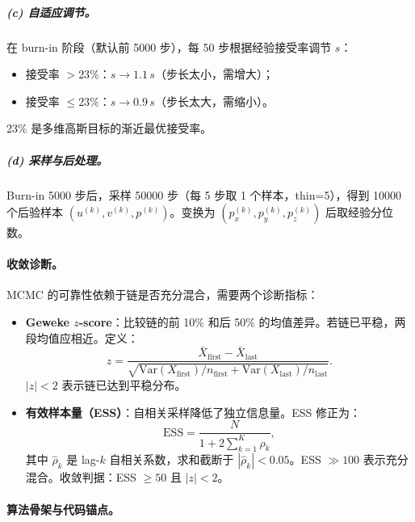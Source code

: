 \documentclass[a4paper, 11pt]{article}
\begin{document}
\subparagraph{(c) 自适应调节。}
在 burn-in 阶段（默认前 5000 步），每 50 步根据经验接受率调节 $s$：
\begin{itemize}[nosep]
  \item 接受率 $> 23\%$：$s \to 1.1\,s$（步长太小，需增大）；
  \item 接受率 $\leq 23\%$：$s \to 0.9\,s$（步长太大，需缩小）。
\end{itemize}
23\% 是多维高斯目标的渐近最优接受率。

\subparagraph{(d) 采样与后处理。}
Burn-in 5000 步后，采样 50000 步（每 5 步取 1 个样本，thin=5），得到 10000 个后验样本 $(u^{(k)}, v^{(k)}, p^{(k)})$。变换为 $(p_x^{(k)}, p_y^{(k)}, p_z^{(k)})$ 后取经验分位数。

\paragraph{收敛诊断。}
MCMC 的可靠性依赖于链是否充分混合，需要两个诊断指标：

\begin{itemize}
  \item \textbf{Geweke $z$-score}：比较链的前 10\% 和后 50\% 的均值差异。若链已平稳，两段均值应相近。定义：
  \begin{equation}
    z = \frac{\bar{X}_\mathrm{first} - \bar{X}_\mathrm{last}}{\sqrt{\mathrm{Var}(X_\mathrm{first})/n_\mathrm{first} + \mathrm{Var}(X_\mathrm{last})/n_\mathrm{last}}}.
  \end{equation}
  $|z| < 2$ 表示链已达到平稳分布。

  \item \textbf{有效样本量（ESS）}：自相关采样降低了独立信息量。ESS 修正为：
  \begin{equation}
    \mathrm{ESS} = \frac{N}{1 + 2\sum_{k=1}^{K} \hat{\rho}_k},
  \end{equation}
  其中 $\hat{\rho}_k$ 是 lag-$k$ 自相关系数，求和截断于 $|\hat{\rho}_k| < 0.05$。ESS $\gg 100$ 表示充分混合。收敛判据：ESS $\geq 50$ 且 $|z| < 2$。
\end{itemize}

\paragraph{算法骨架与代码锚点。}
\end{document}
